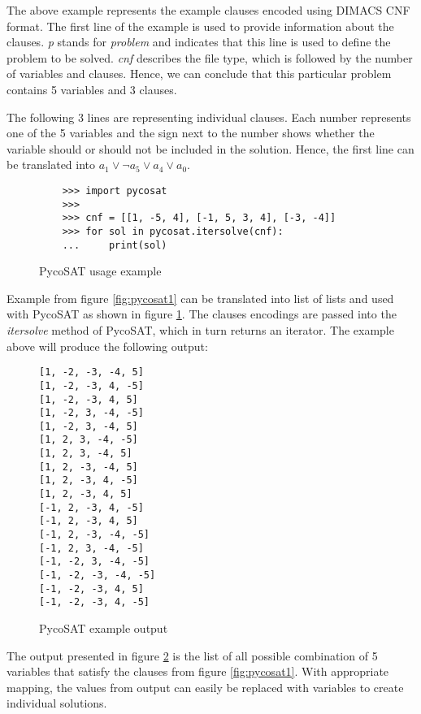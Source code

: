 The above example represents the example clauses encoded using DIMACS CNF format. The first line of the example is used to provide information about the clauses. \textit{p} stands for \textit{problem} and indicates that this line is used to define the problem to be solved. \textit{cnf} describes the file type, which is followed by the number of variables and clauses. Hence, we can conclude that this particular problem contains 5 variables and 3 clauses. 

The following 3 lines are representing individual clauses. Each number represents one of the 5 variables and the sign next to the number shows whether the variable should or should not be included in the solution. Hence, the first line can be translated into $ a_1 \lor \neg a_5 \lor a_4 \lor a_0 $. 

\begin{figure}
\begin{verbatim}
	>>> import pycosat
	>>>
	>>> cnf = [[1, -5, 4], [-1, 5, 3, 4], [-3, -4]]
	>>> for sol in pycosat.itersolve(cnf):
	...	    print(sol)
\end{verbatim}
\caption{PycoSAT usage example}
\label{fig:pycosatUsage}
\end{figure}

Example from figure \ref{fig:pycosat1} can be translated into list of lists and used with PycoSAT as shown in figure \ref{fig:pycosatUsage}. The clauses encodings are passed into the \textit{itersolve} method of PycoSAT, which in turn returns an iterator. The example above will produce the following output:

\begin{figure}
	\begin{verbatim}
[1, -2, -3, -4, 5]
[1, -2, -3, 4, -5]
[1, -2, -3, 4, 5]
[1, -2, 3, -4, -5]
[1, -2, 3, -4, 5]
[1, 2, 3, -4, -5]
[1, 2, 3, -4, 5]
[1, 2, -3, -4, 5]
[1, 2, -3, 4, -5]
[1, 2, -3, 4, 5]
[-1, 2, -3, 4, -5]
[-1, 2, -3, 4, 5]
[-1, 2, -3, -4, -5]
[-1, 2, 3, -4, -5]
[-1, -2, 3, -4, -5]
[-1, -2, -3, -4, -5]
[-1, -2, -3, 4, 5]
[-1, -2, -3, 4, -5]
	\end{verbatim}
	\caption{PycoSAT example output}
	\label{fig:pycosatOutput}
\end{figure}

The output presented in figure \ref{fig:pycosatOutput} is the list of all possible combination of 5 variables that satisfy the clauses from figure \ref{fig:pycosat1}. With appropriate mapping, the values from output can easily be replaced with variables to create individual solutions. 



